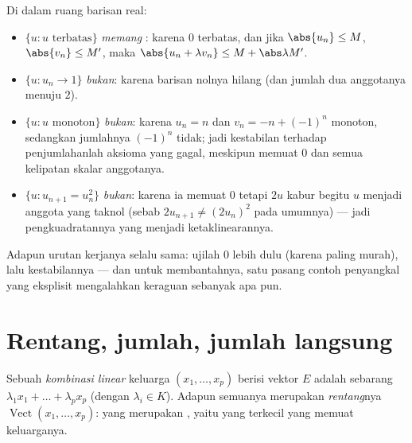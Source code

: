 \begin{example}
\label{ex:b1:vspaces:subspaceornot}
Di dalam ruang barisan real:
\begin{itemize}
  \item $\{u : u \text{ terbatas}\}$ \emph{memang} : karena $0$
        terbatas, dan jika $\abs{u_n} \leq M$, $\abs{v_n} \leq M'$,
        maka $\abs{u_n + \lambda v_n} \leq M + \abs\lambda M'$.
  \item $\{u : u_n \to 1\}$ \emph{bukan}: karena barisan nolnya
        hilang (dan jumlah dua anggotanya menuju $2$).
  \item $\{u : u \text{ monoton}\}$ \emph{bukan}: karena $u_n = n$
        dan $v_n = -n + (-1)^n$ monoton, sedangkan jumlahnya
        $(-1)^n$ tidak; jadi kestabilan terhadap penjumlahanlah aksioma
        yang gagal, meskipun  memuat $0$ dan semua
        kelipatan skalar anggotanya.
  \item $\{u : u_{n+1} = u_n^2\}$ \emph{bukan}: karena ia memuat $0$
        tetapi $2u$ kabur begitu $u$ menjadi anggota yang taknol
        (sebab $2u_{n+1} \neq (2u_n)^2$ pada umumnya) --- jadi pengkuadratannya
        yang menjadi ketaklinearannya.
\end{itemize}
Adapun urutan kerjanya selalu sama: ujilah $0$ lebih dulu (karena paling murah),
lalu kestabilannya --- dan untuk membantahnya, satu pasang contoh penyangkal
yang eksplisit mengalahkan keraguan sebanyak apa pun.
\end{example}

\section{Rentang, jumlah, jumlah langsung}

\begin{definition}\label{def:b1:vspaces:span}
Sebuah \emph{kombinasi linear} keluarga $(x_1, \dots, x_p)$ berisi
vektor $E$ adalah sebarang $\lambda_1 x_1 + \dots + \lambda_p x_p$
(dengan $\lambda_i \in K$). Adapun  semuanya merupakan
\emph{rentang}nya $\operatorname{Vect}(x_1, \dots, x_p)$: yang
merupakan , yaitu yang terkecil yang memuat keluarganya.
\end{definition}

